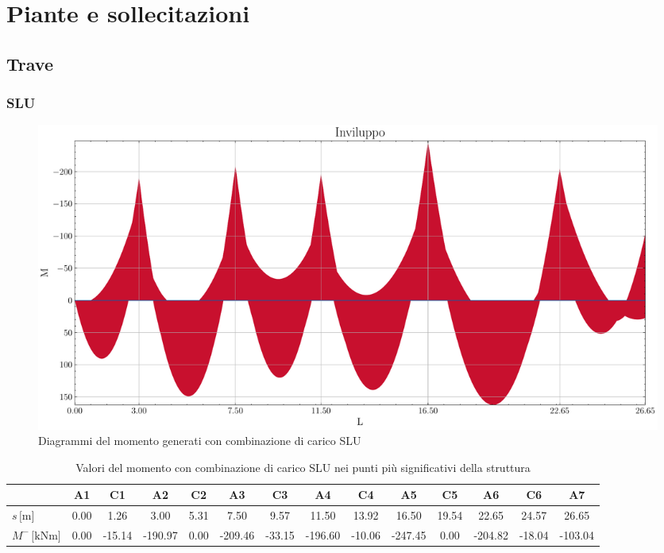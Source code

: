 \chapter{Piante e sollecitazioni}

\section{Trave}
\clearpage	
\begin{landscape}
\subsection{SLU}
\begin{figure}[H]
\centering
\includegraphics[height=0.6\textwidth]{IMG/diagrammi_trave/ULS_M.pdf}
\caption{Diagrammi del momento generati con combinazione di carico SLU}
\label{fig:trave_ULS_momento}
\end{figure}
\begin{table}[H]
\footnotesize
\centering
\caption{Valori del momento con combinazione di carico SLU nei punti più significativi della struttura}
\label{tab:trave_ULS_momento}
	\begin{tabular}{lS[table-format=-3.2]S[table-format=-3.2]S[table-format=-3.2]S[table-format=-3.2]S[table-format=-3.2]S[table-format=-3.2]S[table-format=-3.2]S[table-format=-3.2]S[table-format=-3.2]S[table-format=-3.2]S[table-format=-3.2]S[table-format=-3.2]S[table-format=-3.2]}
		\toprule
		{} & {A1} & {C1} & {A2} & {C2} & {A3} & {C3} & {A4} & {C4} & {A5} & {C5} & {A6} & {C6} & {A7} \\
		\midrule
		$s\,\si{[\metre]}$ & 0.00 & 1.26 & 3.00 & 5.31 & 7.50 & 9.57 & 11.50 & 13.92 & 16.50 & 19.54 & 22.65 & 24.57 & 26.65 \\
        $M^{-}\,\si{[\kilo\newton\metre]}$ & 0.00 & -15.14 & -190.97 & 0.00 & -209.46 & -33.15 & -196.60 & -10.06 & -247.45 & 0.00 & -204.82 & -18.04 & -103.04 \\

\end{tabular}
\end{table}
\end{landscape}
